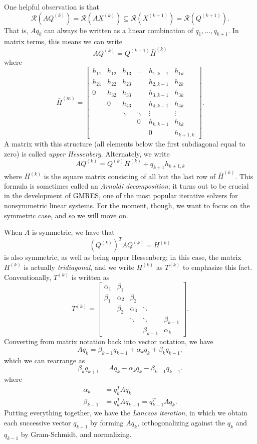 \documentclass[12pt, leqno]{article}
\newcommand{\calR}{\mathcal{R}}
\begin{document}
One helpful observation is that
\[
  \calR(AQ^{(k)}) = \calR(AX^{(k)}) \subseteq
  \calR(X^{(k+1)}) = \calR(Q^{(k+1)}).
  \]
That is, $Aq_k$ can always be written as a linear combination
of $q_1, \ldots, q_{k+1}$.  In matrix terms, this means we can write
\[
  AQ^{(k)} = Q^{(k+1)} \bar{H}^{(k)}
\]  
where
\[
\bar{H}^{(m)} =
\begin{bmatrix}
  h_{11} & h_{12} & h_{13} & \ldots & h_{1,k-1} & h_{1k} \\
  h_{21} & h_{22} & h_{23} &        & h_{2,k-1} & h_{2k} \\
  0     & h_{32} & h_{33} &        & h_{3,k-1} & h_{3k} \\
        & 0      & h_{43} &       & h_{4,k-1} & h_{4k} \\
        &        & \ddots & \ddots & \vdots & \vdots \\
        &        &        & 0      &  h_{k,k-1} & h_{kk} \\
        &        &        &        &  0        & h_{k+1,k}
\end{bmatrix}.
\]
A matrix with this structure (all elements below the first subdiagonal
equal to zero) is called {\em upper Hessenberg}.  Alternately,
we write
\[
  AQ^{(k)} = Q^{(k)} H^{(k)} + q_{k+1} h_{k+1,k}
\]
where $H^{(k)}$ is the square matrix consisting of all but the last
row of $\bar{H}^{(k)}$.  This formula is sometimes called an
{\em Arnoldi decomposition}; it turns out to be crucial in the
development of GMRES, one of the most popular iterative solvers for
nonsymmetric linear systems.  For the moment, though, we want to
focus on the symmetric case, and so we will move on.

When $A$ is symmetric, we have that
\[
  (Q^{(k)})^T A Q^{(k)} = H^{(k)}
\]
is also symmetric, as well as being upper Hessenberg; in this case,
the matrix $H^{(k)}$ is actually {\em tridiagonal}, and we write
$H^{(k)}$ as $T^{(k)}$ to emphasize this fact.  Conventionally,
$T^{(k)}$ is written as
\[
T^{(k)} =
\begin{bmatrix}
  \alpha_1 & \beta_1 \\
  \beta_1 & \alpha_2 & \beta_2 \\
          & \beta_2 & \alpha_3 & \ddots \\
          &         & \ddots & \ddots & \beta_{k-1} \\
          &         &        & \beta_{k-1} & \alpha_k
\end{bmatrix}.
\]
Converting from matrix notation back into vector notation, we have
\[
  A q_{k} = \beta_{k-1} q_{k-1} + \alpha_k q_k + \beta_k q_{k+1},
\]
which we can rearrange as
\[
  \beta_k q_{k+1} = A q_k - \alpha_k q_k - \beta_{k-1} q_{k-1}. 
\]
where
\begin{align*}
  \alpha_k &= q_k^T A q_k \\
  \beta_{k-1} &= q_k^T A q_{k-1} = q_{k-1}^T A q_k.
\end{align*}
Putting everything together, we have the {\em Lanczos iteration},
in which we obtain each successive vector $q_{k+1}$ by forming $Aq_k$,
orthogonalizing against the $q_k$ and $q_{k-1}$ by Gram-Schmidt,
and normalizing.
\end{document}
